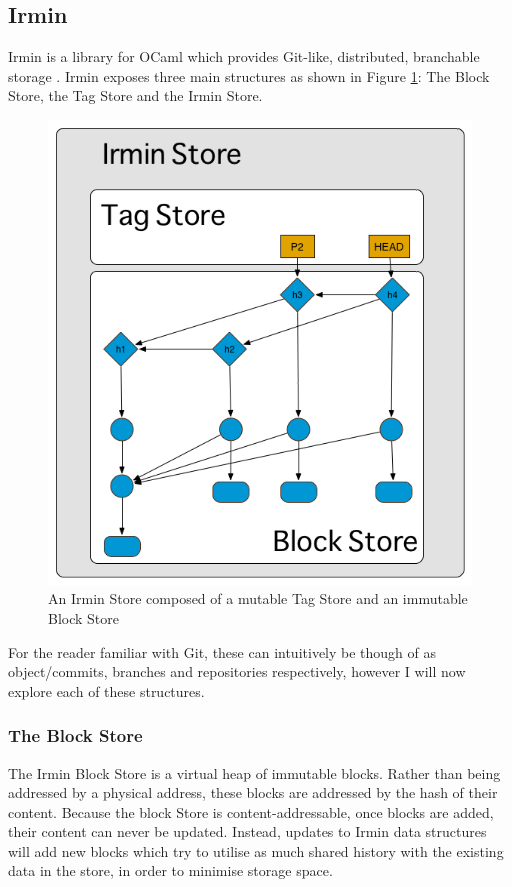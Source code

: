 \documentclass[12pt,a4paper,twoside,openright]{report}
\begin{document}
	\subsection{Irmin}
		Irmin is a library for OCaml which provides Git-like, distributed, branchable storage \cite{Irmin}. 
		Irmin exposes three main structures as shown in Figure \ref{fig:IrminBlockStore}: The Block Store, the Tag Store and the Irmin Store.
		\begin{figure}
			\begin{center}
			\includegraphics[width=13cm]{figs/irmin-stores.png}
			\caption{An Irmin Store composed of a mutable Tag Store and an immutable Block Store}
			\label{fig:IrminBlockStore}
			\end{center}
		\end{figure}
		For the reader familiar with Git, these can intuitively be though of as object/commits, branches and repositories respectively, however I will now explore each of these structures.
		\subsubsection*{The Block Store}
		The Irmin Block Store is a virtual heap of immutable blocks. 
		Rather than being addressed by a physical address, these blocks are addressed by the hash of their content.
		Because the block Store is content-addressable, once blocks are added, their content can never be updated.
		Instead, updates to Irmin data structures will add new blocks which try to utilise as much shared history with the existing data in the store, in order to minimise storage space.
\end{document}

